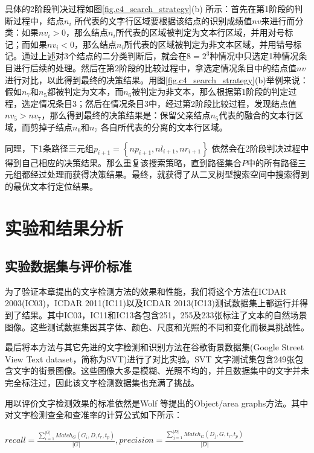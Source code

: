         具体的2阶段判决过程如图\ref{fig.c4_search_strategy}(b) 所示：首先在第1阶段的判断过程中，结点$n_i$ 所代表的文字行区域要根据该结点的识别成绩值$nv$来进行而分类：如果$nv_i>0$，那么结点$n_i$所代表的区域被判定为文本行区域，并用对号标记；而如果$nv_i<0$，那么结点$n_i$所代表的区域被判定为非文本区域，并用错号标记。通过上述对3个结点的二分类判断后，就会在$8=2^3$种情况中只选定1种情况条目进行后续的处理。然后在第2阶段的比较过程中，拿选定情况条目中的结点值$nv$进行对比，以此得到最终的决策结果。用图\ref{fig.c4_search_strategy}(b)举例来说：假如$n_7$和$n_5$都被判定为文本，而$n_6$被判定为非文本，那么根据第1阶段的判定过程，选定情况条目3；然后在情况条目3中，经过第2阶段比较过程，发现结点值$nv_5>nv_7$，那么得到最终的决策结果是：保留父亲结点$n_5$代表的融合的文本行区域，而剪掉子结点$n_6$和$n_7$ 各自所代表的分离的文本行区域。

        同理，下1条路径三元组$p_{i+1}=\left\{np_{i+1},nl_{i+1},nr_{i+1}\right\}$ 依然会在2阶段判决过程中得到自己相应的决策结果。那么重复该搜索策略，直到路径集合$P$中的所有路径三元组都经过处理而获得决策结果。最终，就获得了从二叉树型搜索空间中搜索得到的最优文本行定位结果。

    \section{实验和结果分析}

        \subsection{实验数据集与评价标准}

        为了验证本章提出的文字检测方法的效果和性能，我们将这个方法在ICDAR 2003(IC03)，ICDAR 2011(IC11)以及ICDAR 2013(IC13)测试数据集上都运行并得到了结果。其中IC03，IC11和IC13各包含251，255及233张标注了文本的自然场景图像。这些测试数据集因其字体、颜色、尺度和光照的不同和变化而极具挑战性。

        最后将本方法与其它先进的文字检测和识别方法在谷歌街景数据集(Google Street View Text dataset，简称为SVT)进行了对比实验。SVT 文字测试集包含249张包含文字的街景图像。这些图像大多是模糊、光照不均的，并且数据集中的文字并未完全标注过，因此该文字检测数据集也充满了挑战。

        用以评价文字检测效果的标准依然是Wolf 等\cite{Wolf2006Object}提出的Object/area graphs方法。其中对文字检测查全和查准率的计算公式如下所示：

        $recall = \frac {\sum_{i=1}^{|G|}Match_G(G_i,D,t_r,t_p)} {|G|}  ,   precision =\frac {\sum_{j=1}^{|D|}Match_G(D_j,G,t_r,t_p)} {|D|}$

